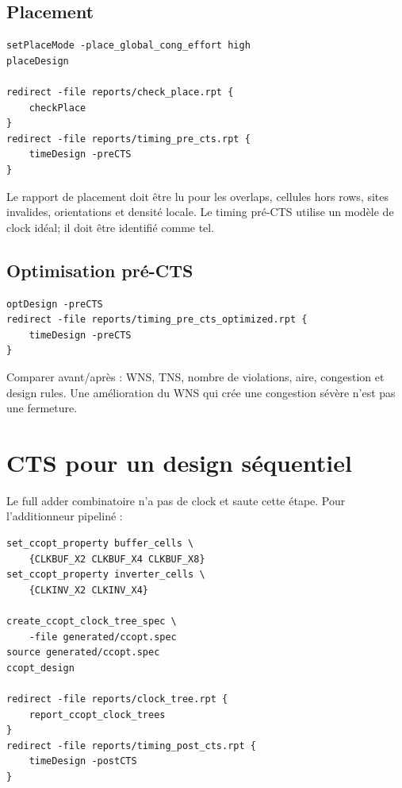 \documentclass[11pt,a4paper,openany]{report}
\begin{document}
\section{Placement}

\begin{lstlisting}[style=guidecode,language=TclGuide]
setPlaceMode -place_global_cong_effort high
placeDesign

redirect -file reports/check_place.rpt {
    checkPlace
}
redirect -file reports/timing_pre_cts.rpt {
    timeDesign -preCTS
}
\end{lstlisting}

Le rapport de placement doit être lu pour les overlaps, cellules hors rows,
sites invalides, orientations et densité locale. Le timing pré-CTS utilise un
modèle de clock idéal; il doit être identifié comme tel.

\section{Optimisation pré-CTS}

\begin{lstlisting}[style=guidecode,language=TclGuide]
optDesign -preCTS
redirect -file reports/timing_pre_cts_optimized.rpt {
    timeDesign -preCTS
}
\end{lstlisting}

Comparer avant/après : WNS, TNS, nombre de violations, aire, congestion et
design rules. Une amélioration du WNS qui crée une congestion sévère n'est pas
une fermeture.

\chapter{CTS pour un design séquentiel}

Le full adder combinatoire n'a pas de clock et saute cette étape. Pour
l'additionneur pipeliné :

\begin{lstlisting}[style=guidecode,language=TclGuide]
set_ccopt_property buffer_cells \
    {CLKBUF_X2 CLKBUF_X4 CLKBUF_X8}
set_ccopt_property inverter_cells \
    {CLKINV_X2 CLKINV_X4}

create_ccopt_clock_tree_spec \
    -file generated/ccopt.spec
source generated/ccopt.spec
ccopt_design

redirect -file reports/clock_tree.rpt {
    report_ccopt_clock_trees
}
redirect -file reports/timing_post_cts.rpt {
    timeDesign -postCTS
}
\end{lstlisting}
\end{document}
